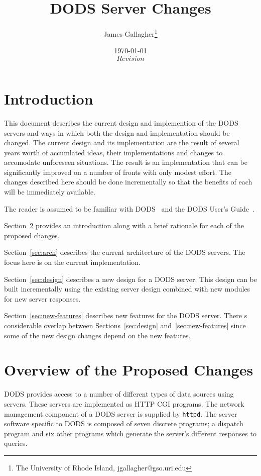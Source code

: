 \documentclass{article}
\newcommand{\httpd}{\texttt{httpd}\xspace}
\begin{document}
\title{DODS Server Changes}
\author{James Gallagher\thanks{The University of Rhode Island,
    jgallagher@gso.uri.edu}}
\date{\today \\ $Revision$ }



\maketitle
\tableofcontents

\section{Introduction}

This document describes the current design and implemention of the DODS
servers and ways in which both the design and implementation should be
changed. The current design and its implementation are the result of several
years worth of accumlated ideas, their implementations and changes to
accomodate unforeseen situations. The result is an implementation that can be
significantly improved on a number of fronts with only modest effort. The
changes described here should be done incrementally so that the benefits of
each will be immediately available.

The reader is assumed to be familiar with DODS~\cite{DODS:home-page} and the
DODS User's Guide~\cite{DODS:users-guide}.

Section~\ref{sec:overview} provides an introduction along with a brief
rationale for each of the proposed changes.

Section~\ref{sec:arch} describes the current architecture of the DODS
servers. The focus here is on the current implementation.

Section~\ref{sec:design} describes a new design for a DODS server. This
design can be built incrementally using the existing server design combined
with new modules for new server responses.

Section~\ref{sec:new-features} describes new features for the DODS server.
There s considerable overlap between Sections~\ref{sec:design}
and~\ref{sec:new-features} since some of the new design changes depend on the
new features.

\section{Overview of the Proposed Changes}
\label{sec:overview}

DODS provides access to a number of different types of data sources using
servers. These servers are implemented as HTTP CGI programs. The network
management component of a DODS server is supplied by \httpd. The
server software specific to DODS is composed of seven discrete programs; a
dispatch program and six other programs which generate the server's different
responses to queries. 
\end{document}
